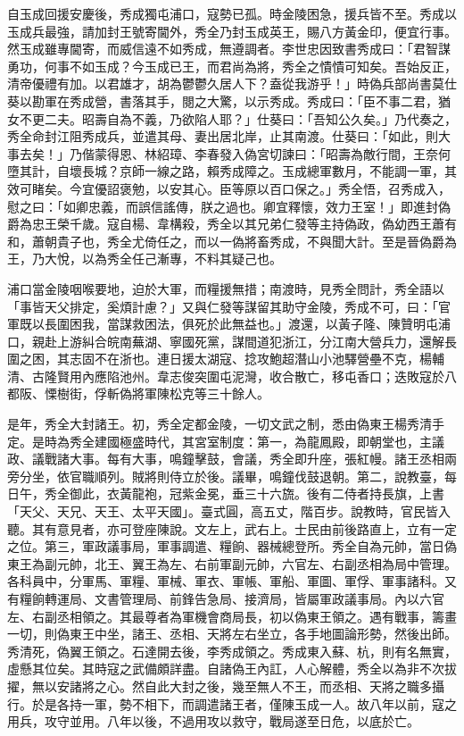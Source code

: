 \begin{pinyinscope}
自玉成回援安慶後，秀成獨屯浦口，寇勢已孤。時金陵困急，援兵皆不至。秀成以玉成兵最強，請加封王號寄閫外，秀全乃封玉成英王，賜八方黃金印，便宜行事。然玉成雖專閫寄，而威信遠不如秀成，無遵調者。李世忠因致書秀成曰：「君智謀勇功，何事不如玉成？今玉成已王，而君尚為將，秀全之憒憒可知矣。吾始反正，清帝優禮有加。以君雄才，胡為鬱鬱久居人下？盍從我游乎！」時偽兵部尚書莫仕葵以勘軍在秀成營，書落其手，閱之大驚，以示秀成。秀成曰：「臣不事二君，猶女不更二夫。昭壽自為不義，乃欲陷人耶？」仕葵曰：「吾知公久矣。」乃代奏之，秀全命封江阻秀成兵，並遣其母、妻出居北岸，止其南渡。仕葵曰：「如此，則大事去矣！」乃偕蒙得恩、林紹璋、李春發入偽宮切諫曰：「昭壽為敵行間，王奈何墮其計，自壞長城？京師一線之路，賴秀成障之。玉成總軍數月，不能調一軍，其效可睹矣。今宜優詔褒勉，以安其心。臣等原以百口保之。」秀全悟，召秀成入，慰之曰：「如卿忠義，而誤信謠傳，朕之過也。卿宜釋懷，效力王室！」即進封偽爵為忠王榮千歲。寇自楊、韋構殺，秀全以其兄弟仁發等主持偽政，偽幼西王蕭有和，蕭朝貴子也，秀全尤倚任之，而以一偽將畜秀成，不與聞大計。至是晉偽爵為王，乃大悅，以為秀全任己漸專，不料其疑己也。

浦口當金陵咽喉要地，迫於大軍，而糧援無措；南渡時，見秀全問計，秀全語以「事皆天父排定，奚煩計慮？」又與仁發等謀留其助守金陵，秀成不可，曰：「官軍既以長圍困我，當謀救困法，俱死於此無益也。」渡還，以黃子隆、陳贊明屯浦口，親赴上游糾合皖南蕪湖、寧國死黨，謀間道犯浙江，分江南大營兵力，還解長圍之困，其志固不在浙也。連日援太湖寇、捻攻鮑超潛山小池驛營壘不克，楊輔清、古隆賢用內應陷池州。韋志俊突圍屯泥灣，收合散亡，移屯香口；迭敗寇於八都阪、慄樹街，俘斬偽將軍陳松克等三十餘人。

是年，秀全大封諸王。初，秀全定都金陵，一切文武之制，悉由偽東王楊秀清手定。是時為秀全建國極盛時代，其宮室制度：第一，為龍鳳殿，即朝堂也，主議政、議戰諸大事。每有大事，鳴鐘擊鼓，會議，秀全即升座，張紅幔。諸王丞相兩旁分坐，依官職順列。賊將則侍立於後。議畢，鳴鐘伐鼓退朝。第二，說教臺，每日午，秀全御此，衣黃龍袍，冠紫金冕，垂三十六旒。後有二侍者持長旗，上書「天父、天兄、天王、太平天國」。臺式圓，高五丈，階百步。說教時，官民皆入聽。其有意見者，亦可登座陳說。文左上，武右上。士民由前後路直上，立有一定之位。第三，軍政議事局，軍事調遣、糧餉、器械總登所。秀全自為元帥，當日偽東王為副元帥，北王、翼王為左、右前軍副元帥，六官左、右副丞相為局中管理。各科員中，分軍馬、軍糧、軍械、軍衣、軍帳、軍船、軍圖、軍俘、軍事諸科。又有糧餉轉運局、文書管理局、前鋒告急局、接濟局，皆屬軍政議事局。內以六官左、右副丞相領之。其最尊者為軍機會商局長，初以偽東王領之。遇有戰事，籌畫一切，則偽東王中坐，諸王、丞相、天將左右坐立，各手地圖論形勢，然後出師。秀清死，偽翼王領之。石達開去後，李秀成領之。秀成東入蘇、杭，則有名無實，虛懸其位矣。其時寇之武備頗詳盡。自諸偽王內訌，人心解體，秀全以為非不次拔擢，無以安諸將之心。然自此大封之後，幾至無人不王，而丞相、天將之職多攝行。於是各持一軍，勢不相下，而調遣諸王者，僅陳玉成一人。故八年以前，寇之用兵，攻守並用。八年以後，不過用攻以救守，戰局遂至日危，以底於亡。


\end{pinyinscope}
